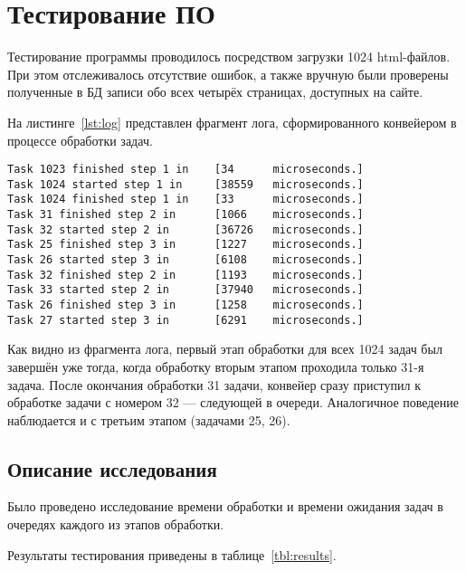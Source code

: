 \chapter{Тестирование ПО}

Тестирование программы проводилось посредством загрузки 1024 html-файлов.
При этом отслеживалось отсутствие ошибок, а также вручную были проверены полученные в БД записи обо всех четырёх страницах, доступных на сайте.

На листинге~\ref{lst:log} представлен фрагмент лога, сформированного конвейером в процессе обработки задач.

\begin{lstlisting}[caption={фрагмент лога программы},label={lst:log}]
Task 1023 finished step 1 in    [34      microseconds.]
Task 1024 started step 1 in     [38559   microseconds.]
Task 1024 finished step 1 in    [33      microseconds.]
Task 31 finished step 2 in      [1066    microseconds.]
Task 32 started step 2 in       [36726   microseconds.]
Task 25 finished step 3 in      [1227    microseconds.]
Task 26 started step 3 in       [6108    microseconds.]
Task 32 finished step 2 in      [1193    microseconds.]
Task 33 started step 2 in       [37940   microseconds.]
Task 26 finished step 3 in      [1258    microseconds.]
Task 27 started step 3 in       [6291    microseconds.]
\end{lstlisting}

Как видно из фрагмента лога, первый этап обработки для всех 1024 задач был завершён уже тогда, когда обработку вторым этапом проходила только 31-я задача.
После окончания обработки 31 задачи, конвейер сразу приступил к обработке задачи с номером 32 --- следующей в очереди. Аналогичное поведение наблюдается и с третьим этапом (задачами 25, 26).

\section{Описание исследования}

Было проведено исследование времени обработки и времени ожидания задач в очередях каждого из этапов обработки.

Результаты тестирования приведены в таблице~\ref{tbl:results}.

